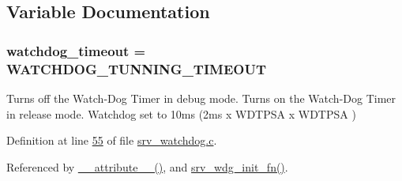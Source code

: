 \subsection{Variable Documentation}
\hypertarget{a00066_a159d343205105c86a6dec5da26cfdfe0}{
\subsubsection[{watchdog\+\_\+timeout}]{ watchdog\+\_\+timeout = {\bf W\+A\+T\+C\+H\+D\+O\+G\+\_\+\+T\+U\+N\+N\+I\+N\+G\+\_\+\+T\+I\+M\+E\+O\+U\+T}}}\label{a00066_a159d343205105c86a6dec5da26cfdfe0}


Turns off the Watch-\/\+Dog Timer in debug mode. Turns on the Watch-\/\+Dog Timer in release mode. Watchdog set to 10ms (2ms x W\+D\+T\+P\+S\+A x W\+D\+T\+P\+S\+A ) 



Definition at line \hyperlink{a00066_source_l00055}{55} of file \hyperlink{a00066_source}{srv\+\_\+watchdog.\+c}.



Referenced by \hyperlink{a00066_source_l00066}{\+\_\+\+\_\+attribute\+\_\+\+\_\+()}, and \hyperlink{a00066_source_l00096}{srv\+\_\+wdg\+\_\+init\+\_\+fn()}.

